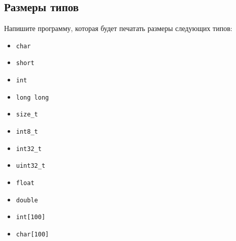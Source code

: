 \documentclass{article}
\begin{document}
\subsection{Размеры типов}
Напишите программу, которая будет печатать размеры следующих типов:
\begin{multicols}{4}
\begin{itemize}
\item \texttt{char}
\item \texttt{short}
\item \texttt{int}
\item \texttt{long long}
\item \texttt{size\_t}
\item \texttt{int8\_t}
\item \texttt{int32\_t}
\item \texttt{uint32\_t}
\item \texttt{float}
\item \texttt{double}
\item \texttt{int[100]}
\item \texttt{char[100]}
\end{itemize}
\end{multicols}
\end{document}
